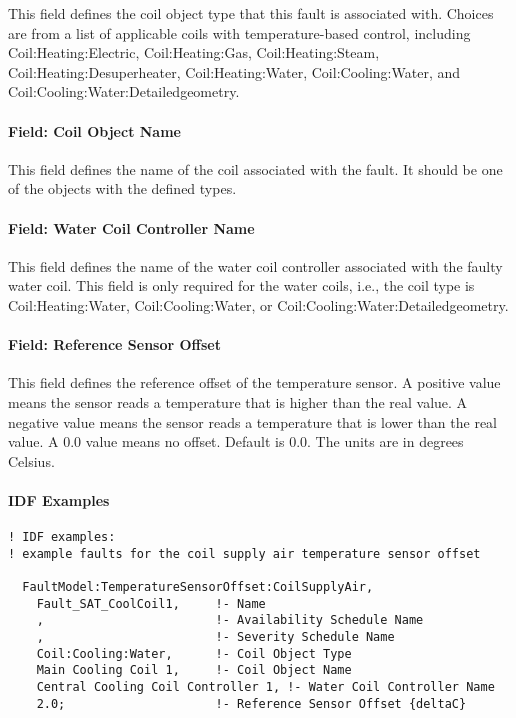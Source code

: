This field defines the coil object type that this fault is associated with. Choices are from a list of applicable coils with temperature-based control, including Coil:Heating:Electric, Coil:Heating:Gas, Coil:Heating:Steam, Coil:Heating:Desuperheater, Coil:Heating:Water, Coil:Cooling:Water, and Coil:Cooling:Water:Detailedgeometry.

\paragraph{Field: Coil Object Name}\label{field-coil-object-name}

This field defines the name of the coil associated with the fault. It should be one of the objects with the defined types.

\paragraph{Field: Water Coil Controller Name}\label{field-water-coil-controller-name}

This field defines the name of the water coil controller associated with the faulty water coil. This field is only required for the water coils, i.e., the coil type is Coil:Heating:Water, Coil:Cooling:Water, or Coil:Cooling:Water:Detailedgeometry.

\paragraph{Field: Reference Sensor Offset}\label{field-reference-sensor-offset}

This field defines the reference offset of the temperature sensor. A positive value means the sensor reads a temperature that is higher than the real value. A negative value means the sensor reads a temperature that is lower than the real value. A 0.0 value means no offset. Default is 0.0. The units are in degrees Celsius.

\paragraph{IDF Examples}

\begin{lstlisting}
! IDF examples:
! example faults for the coil supply air temperature sensor offset

  FaultModel:TemperatureSensorOffset:CoilSupplyAir,
    Fault_SAT_CoolCoil1,     !- Name
    ,                        !- Availability Schedule Name
    ,                        !- Severity Schedule Name
    Coil:Cooling:Water,      !- Coil Object Type
    Main Cooling Coil 1,     !- Coil Object Name
    Central Cooling Coil Controller 1, !- Water Coil Controller Name
    2.0;                     !- Reference Sensor Offset {deltaC}

\end{lstlisting}



